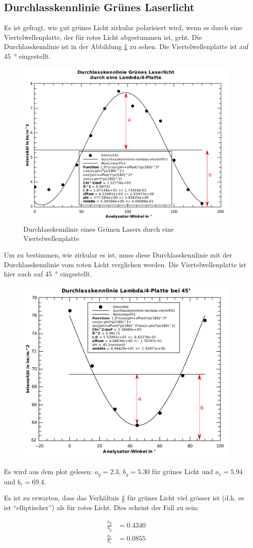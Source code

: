 \subsection{Durchlasskennlinie Gr\"unes Laserlicht}

Es ist gefragt, wie gut gr\"unes Licht zirkular polarisiert wird, wenn es  durch
eine Viertelwellenplatte, der  f\"ur  rotes  Licht  abgestummen  ist,  geht. Die
Durchlasskennlinie  ist  in  der Abbildung  \ref{fig:aufgabe-6}  zu  sehen.  Die
Viertelwellenplatte ist auf \SI{45}{\degree} eingestellt.

\begin{figure}[H]
    \centering
    \includegraphics[width=.6\linewidth]{images/aufgabe-6.pdf}
    \caption{Durchlasskennlinie eines Gr\"unen Lasers durch eine Viertelwellenplatte}
    \label{fig:aufgabe-6}
\end{figure}

Um  zu  bestimmen,  wie zirkular es ist, muss diese Durchlasskennlinie  mit  der
Durchlasskennlinie vom roten  Licht  verglichen  werden. Die Viertelwellenplatte
ist hier auch auf \SI{45}{\degree} eingestellt.

\begin{figure}[H]
    \centering
    \includegraphics[width=.6\linewidth]{images/aufgabe-6_rot.pdf}
    \caption{}
    \label{fig:aufgabe-6_rot}
\end{figure}

Es wird aus dem plot gelesen: $a_g = 2.3$, $b_g = 5.30$ f\"ur gr\"unes Licht und
$a_r = 5.94$ und $b_r = 69.4$.

Es ist zu erwarten, dass  das  Verh\"altnis  $\frac{a}{b}$  f\"ur gr\"unes Licht
viel gr\"osser ist (d.h. es  ist  ``elliptischer'')  als f\"ur rotes Licht. Dies
scheint der Fall zu sein:

\begin{align*}
    \frac{a_g}{b_g} &= 0.4340 \\
    \frac{a_r}{b_r} &= 0.0855 \\
\end{align*}

